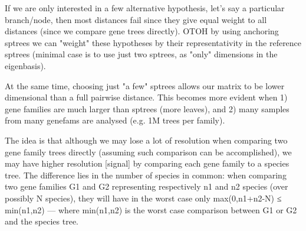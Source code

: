 If we are only interested in a few alternative hypothesis, let’s say a particular branch/node, then most distances fail
since they give equal weight to all distances (since we compare gene trees directly). OTOH by using anchoring sptrees we
can "weight" these hypotheses by their representativity in the reference sptrees (minimal case is to use just two
sptrees, as "only" dimensions in the eigenbasis).

At the same time, choosing just "a few" sptrees allows our matrix to be lower dimensional than a full pairwise distance.
This becomes more evident when 1) gene families are much larger than sptrees (more leaves), and 2) many samples from
many genefams are analysed (e.g. 1M trees per family).

The idea is that although we may lose a lot of resolution when comparing two gene family trees directly (assuming such
comparison can be accomplished), we may have higher resolution [signal] by comparing each gene family to a species tree.
The difference lies in the number of species in common: when comparing two gene families G1 and G2 representing
respectively n1 and n2 species (over possibly N species), they will have in the worst case only max(0,n1+n2-N) ≤
min(n1,n2)  ---  where min(n1,n2) is the worst case comparison between G1 or G2 and the species tree.


